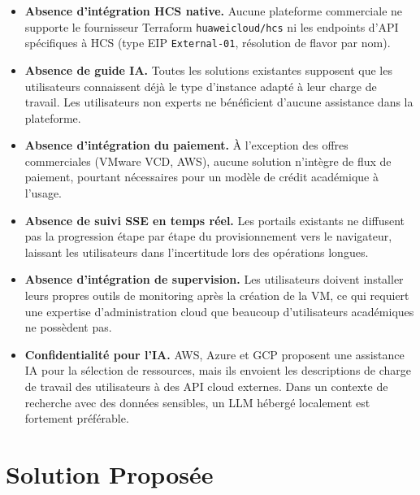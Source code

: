 \begin{itemize}
  \item \textbf{Absence d'intégration HCS native.} Aucune plateforme commerciale ne
        supporte le fournisseur Terraform \texttt{huaweicloud/hcs} ni les endpoints
        d'API spécifiques à HCS (type EIP \texttt{External-01}, résolution de flavor
        par nom).

  \item \textbf{Absence de guide IA.} Toutes les solutions existantes supposent que
        les utilisateurs connaissent déjà le type d'instance adapté à leur charge de
        travail. Les utilisateurs non experts ne bénéficient d'aucune assistance
        dans la plateforme.

  \item \textbf{Absence d'intégration du paiement.} À l'exception des offres
        commerciales (VMware VCD, AWS), aucune solution n'intègre de flux de paiement,
        pourtant nécessaires pour un modèle de crédit académique à l'usage.

  \item \textbf{Absence de suivi SSE en temps réel.} Les portails existants ne
        diffusent pas la progression étape par étape du provisionnement vers le
        navigateur, laissant les utilisateurs dans l'incertitude lors des opérations
        longues.

  \item \textbf{Absence d'intégration de supervision.} Les utilisateurs doivent
        installer leurs propres outils de monitoring après la création de la VM, ce
        qui requiert une expertise d'administration cloud que beaucoup d'utilisateurs
        académiques ne possèdent pas.

  \item \textbf{Confidentialité pour l'IA.} AWS, Azure et GCP proposent une
        assistance IA pour la sélection de ressources, mais ils envoient les
        descriptions de charge de travail des utilisateurs à des API cloud externes.
        Dans un contexte de recherche avec des données sensibles, un LLM hébergé
        localement est fortement préférable.
\end{itemize}

\section{Solution Proposée}

